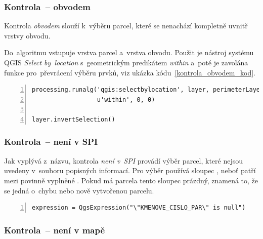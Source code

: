 \subsubsection{Kontrola~– obvodem}
\label{kontrola_obvodem}

Kontrola \textit{obvodem} slouží k~výběru parcel, které se nenachází
kompletně uvnitř vrstvy obvodu.

Do~algoritmu vstupuje vrstva parcel a~vrstva obvodu. Použit je nástroj
systému QGIS \textit{Select by~location} s~geometrickým predikátem
\textit{within} a~poté je zavolána funkce pro~převrácení výběru prvků,
viz ukázka kódu~\ref{kontrola_obvodem_kod}.

{\scriptsize
\begin{lstlisting}[style=python, caption={Kontrola \textit{obvodem}~–
výběr prvků}, captionpos=b, label=kontrola_obvodem_kod,
backgroundcolor = \color{light-gray}, numbers=left]
processing.runalg('qgis:selectbylocation', layer, perimeterLayer,
                  u'within', 0, 0)

layer.invertSelection()
\end{lstlisting}}

\subsubsection{Kontrola~– není v SPI}
\label{kontrola_neni_v_spi}

Jak vyplývá z~názvu, kontrola \textit{není v~SPI} provádí výběr
parcel, které nejsou uvedeny v~souboru popisných informací. Pro výběr
používá sloupec \texttt{}, neboť patří
mezi povinně vyplněné \citep{struktura_vfk}. Pokud má parcela tento
sloupec prázdný, znamená to, že se jedná o~chybu nebo nově vytvořenou
parcelu.

{\scriptsize
\begin{lstlisting}[style=python, caption={Kontrola \textit{není
v~SPI}~– vzorec pro~výběr prvků}, captionpos=b,
label=kontrola_spi_kod, backgroundcolor = \color{light-gray},
numbers=left]
expression = QgsExpression("\"KMENOVE_CISLO_PAR\" is null")
\end{lstlisting}}

\subsubsection{Kontrola~– není v mapě}
\label{kontrola_neni_v_mape}

